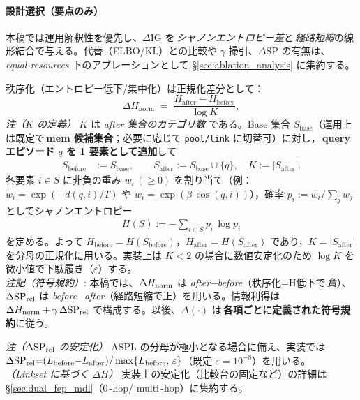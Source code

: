 \documentclass[ja=standard,xelatex]{bxjsarticle}
\begin{document}
\paragraph{設計選択（要点のみ）}\label{sec:ig_design_choice}
本稿では運用解釈性を優先し、$\Delta\mathrm{IG}$ を\,\emph{シャノンエントロピー差}と\,\emph{経路短縮}の線形結合で与える。代替（ELBO/KL）との比較や $\gamma$ 掃引、$\Delta\mathrm{SP}$ の有無は、\,\emph{equal‑resources} 下のアブレーションとして \S\ref{sec:ablation_analysis} に集約する。

秩序化（エントロピー低下/集中化）は正規化差分として：
\begin{equation}
  \Delta H_{\mathrm{norm}}\;=\;\frac{H_{\text{after}} - H_{\text{before}}}{\log K},\label{eq:dh_norm}
\end{equation}
\noindent\textit{注（$K$ の定義）}\; $K$ は \emph{after 集合のカテゴリ数} である。Base 集合 $S_{\text{base}}$（運用上は既定で\,\textbf{mem 候補集合}；必要に応じて \texttt{pool/link} に切替可）に対し，\,\textbf{query エピソード $q$ を 1 要素として追加}して
\begin{align*}
  S_{\text{before}} &:= S_{\text{base}},\qquad
  S_{\text{after}}  := S_{\text{base}}\cup\{q\},\quad
  K := |S_{\text{after}}|.\tag*{}
\end{align*}
各要素 $i\in S$ に非負の重み $w_i\,(\ge 0)$ を割り当て（例：$w_i=\exp(-d(q,i)/T)$ や $w_i=\exp(\beta\,\cos(q,i))$），確率 $p_i:=w_i/\sum_j w_j$ としてシャノンエントロピー
\begin{align*}
  H(S) := -\sum_{i\in S} p_i\,\log p_i
\end{align*}
を定める。よって $H_{\text{before}}{=}H(S_{\text{before}})$，$H_{\text{after}}{=}H(S_{\text{after}})$ であり，$K{=}|S_{\text{after}}|$ を分母の正規化に用いる。実装上は $K{<}2$ の場合に数値安定化のため $\log K$ を微小値で下駄履き（$\varepsilon$）する。\\
\noindent\textit{注記（符号規約）}: 本稿では、$\Delta H_{\rm norm}$ は \emph{after−before}（秩序化=H低下で\,\emph{負}）、$\Delta\mathrm{SP}_{\rm rel}$ は \emph{before−after}（経路短縮で正）を用いる。情報利得は $\Delta H_{\rm norm}+\gamma\,\Delta\mathrm{SP}_{\rm rel}$ で構成する。以後、$\Delta(\cdot)$ は\,\textbf{各項ごとに定義された符号規約}に従う。

\noindent\textit{注（$\Delta\mathrm{SP}_{\rm rel}$ の安定化）}\; $\mathrm{ASPL}$ の分母が極小となる場合に備え、実装では $\Delta\mathrm{SP}_{\rm rel}{=}(L_{\rm before}{-}L_{\rm after})/\max\{L_{\rm before},\,\varepsilon\}$（既定 $\varepsilon{=}10^{-8}$）を用いる。
\\
\noindent\textit{（Linkset に基づく $\Delta H$）}\; 実装上の安定化（比較台の固定など）の詳細は \S\ref{sec:dual_fep_mdl}（0\,\mbox{-}hop/ multi\,\mbox{-}hop）に集約する。
\end{document}
